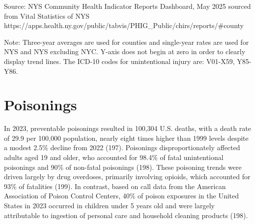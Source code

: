 \documentclass[
  english,
  letterpaper,
]{report}
\begin{document}
\begin{tcolorbox}[enhanced jigsaw, breakable, leftrule=.75mm, title=\textcolor{quarto-callout-note-color}{\faInfo}\hspace{0.5em}{Source}, bottomrule=.15mm, opacityback=0, left=2mm, colback=white, bottomtitle=1mm, coltitle=black, colbacktitle=quarto-callout-note-color!10!white, colframe=quarto-callout-note-color-frame, opacitybacktitle=0.6, toptitle=1mm, titlerule=0mm, arc=.35mm, rightrule=.15mm, toprule=.15mm]

Source: NYS Community Health Indicator Reports Dashboard, May 2025
sourced from Vital Statistics of NYS
https://apps.health.ny.gov/public/tabvis/PHIG\_Public/chirs/reports/\#county

\end{tcolorbox}

\begin{tcolorbox}[enhanced jigsaw, breakable, leftrule=.75mm, title=\textcolor{quarto-callout-note-color}{\faInfo}\hspace{0.5em}{Note}, bottomrule=.15mm, opacityback=0, left=2mm, colback=white, bottomtitle=1mm, coltitle=black, colbacktitle=quarto-callout-note-color!10!white, colframe=quarto-callout-note-color-frame, opacitybacktitle=0.6, toptitle=1mm, titlerule=0mm, arc=.35mm, rightrule=.15mm, toprule=.15mm]

Note: Three-year averages are used for counties and single-year rates
are used for NYS and NYS excluding NYC. Y-axis does not begin at zero in
order to clearly display trend lines. The ICD-10 codes for unintentional
injury are: V01-X59, Y85-Y86.

\end{tcolorbox}

\section{Poisonings}\label{poisonings}

In 2023, preventable poisonings resulted in 100,304 U.S. deaths, with a
death rate of 29.9 per 100,000 population, nearly eight times higher
than 1999 levels despite a modest 2.5\% decline from 2022 (197).
Poisonings disproportionately affected adults aged 19 and older, who
accounted for 98.4\% of fatal unintentional poisonings and 90\% of
non-fatal poisonings (198). These poisoning trends were driven largely
by drug overdoses, primarily involving opioids, which accounted for 93\%
of fatalities (199). In contrast, based on call data from the American
Association of Poison Control Centers, 40\% of poison exposures in the
United States in 2023 occurred in children under 5 years old and were
largely attributable to ingestion of personal care and household
cleaning products (198).
\end{document}
